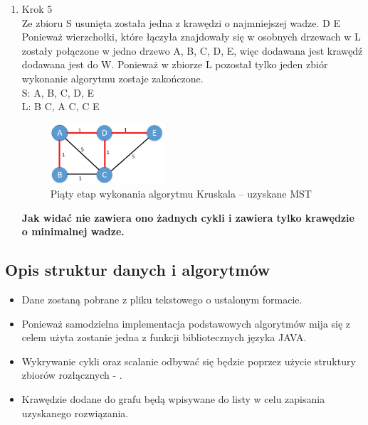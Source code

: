 \begin{enumerate}
\item Krok 5\\
Ze zbioru S usunięta została jedna z krawędzi o najmniejszej wadze. {D E} Ponieważ wierzchołki, które łączyła znajdowały się w osobnych drzewach w L zostały połączone w jedno drzewo {A, B, C, D, E}, więc dodawana jest krawędź dodawana jest do W. Ponieważ w zbiorze L pozostał tylko jeden zbiór wykonanie algorytmu zostaje zakończone.\\
S: {A, B, C, D, E}
\\
L: {B C}, {A C}, {C E}
\\
\begin{figure}[htb!]
	\centering
	\includegraphics[width=0.4\textwidth]{tex/fig/Picture6}
	\caption{Piąty etap wykonania algorytmu Kruskala – uzyskane MST}
	\label{fig: legendK5}
\end{figure}

\textbf{Jak widać nie zawiera ono żadnych cykli i zawiera tylko krawędzie o minimalnej wadze.}\\
\end{enumerate}
\newpage
\subsection{Opis struktur danych i algorytmów}
\begin{itemize}
		\item Dane zostaną pobrane z pliku tekstowego o ustalonym formacie.
		\item Ponieważ samodzielna implementacja podstawowych algorytmów mija się z celem użyta zostanie jedna z funkcji bibliotecznych języka JAVA.
		\item Wykrywanie cykli oraz scalanie odbywać się będzie poprzez użycie struktury zbiorów rozłącznych - \cite{gis2}.
		\item Krawędzie dodane do grafu będą wpisywane do listy w celu zapisania uzyskanego rozwiązania.
\end{itemize}
